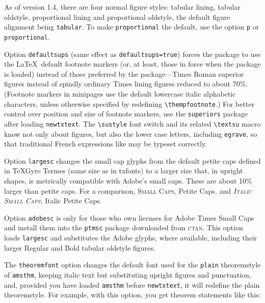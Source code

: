 \documentclass[11pt]{article}
\theoremstyle{oldplain}
\theoremstyle{plain}
\begin{document}
As of version 1.4, there are four normal figure styles: tabular lining, tabular oldstyle, proportional lining and proportional oldstyle, the default figure alignment being \texttt{tabular}. To make \texttt{proportional} the default, use the option \texttt{p} or \texttt{proportional}.

Option {\tt defaultsups} (same effect as {\tt defaultsups=true}) forces the package to use the \LaTeX\ default footnote markers (or, at least, those in force when the package is loaded) instead of those preferred by the package---Times Roman superior figures instead of spindly ordinary Times lining figures reduced to about 70\%. (Footnote markers in minipages use the default lowercase italic alphabetic characters, unless otherwise specified by redefining \verb|\thempfootnote|.) For better control over position and size of footnote markers, use the {\tt superiors} package after loading {\tt newtxtext}. The \verb|\sustyle| font switch and its related \verb|\textsu| macro know not only about figures, but also the lower case letters, including \texttt{egrave}, so that traditional French expressions like  may be typeset correctly.

Option \texttt{largesc} changes the small cap glyphs from the default petite caps defined in TeXGyre Termes (same size as in txfonts) to a larger size that, in upright shapes, is metrically compatible with Adobe's small caps. These are about 10\% larger than petite caps. For a comparison, \textsc{Small Caps}, {Petite Caps}, and \textsc{\textit{Italic Small Caps}}, {Italic Petite Caps}.

Option \texttt{adobesc} is only for those who own licenses for \textsf{Adobe Times Small Caps} and install them into the \texttt{ptmsc} package downloaded from \textsc{ctan}. This option loads \texttt{largesc} and substitutes the Adobe glyphs, where available, including their larger Regular and Bold tabular oldstyle figures.

The {\tt theoremfont} option changes the default font used for the {\tt plain} theoremstyle of {\tt amsthm}, keeping italic text but substituting upright figures and punctuation, and, provided you have loaded {\tt amsthm} before {\tt newtxtext}, it will redefine the plain theoremstyle.  For example, with this option, you get theorem statements like this:
\end{document}
